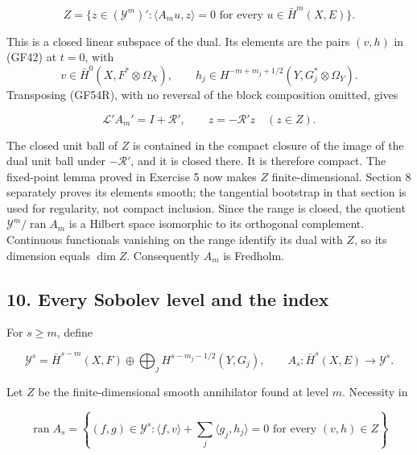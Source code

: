 \documentclass[
  11pt,
]{article}
\makeatletter
\let\ReaderOriginalAnchorStart\hyper@anchorstart
\let\ReaderOriginalAnchorEnd\hyper@anchorend
\let\ReaderPendingAliases\@empty
\def\ReaderArmAliases#1{\gdef\ReaderPendingAliases{#1}}
\def\hyper@anchorstart#1{\ReaderIfNativeAnchorTF{#1}{\ReaderPendingAliases\global\let\ReaderPendingAliases\@empty}{}\ReaderOriginalAnchorStart{#1}}
\makeatother
\begin{document}
\[
 Z=\{z\in(\mathcal Y^m)':\langle A_mu,z\rangle=0
           \text{ for every }u\in\bar H^m(X,E)\}.
 \tag{GF54Z}
\]

This is a closed linear subspace of the dual. Its elements are the pairs
\((v,h)\) in (GF42) at \(t=0\), with \[
 v\in\bar H^0(X,F^*\otimes\Omega_X),\qquad
 h_j\in H^{-m+m_j+1/2}(Y,G_j^*\otimes\Omega_Y).
\] Transposing (GF54R), with no reversal of the block composition
omitted, gives

\[
 \mathscr L'A_m'=I+\mathscr R',\qquad
 z=-\mathscr R'z\quad(z\in Z).
 \tag{GF54D}
\]

The closed unit ball of \(Z\) is contained in the compact closure of the
image of the dual unit ball under \(-\mathscr R'\), and it is closed
there. It is therefore compact. The fixed-point lemma proved in Exercise
5 now makes \(Z\) finite-dimensional. Section 8 separately proves its
elements smooth; the tangential bootstrap in that section is used for
regularity, not compact inclusion. Since the range is closed, the
quotient \(\mathcal Y^m/\operatorname{ran}A_m\) is a Hilbert space
isomorphic to its orthogonal complement. Continuous functionals
vanishing on the range identify its dual with \(Z\), so its dimension
equals \(\dim Z\). Consequently \(A_m\) is Fredholm.

\ReaderArmAliases{\ReaderOriginalAnchorStart{AN03-GCF-010}\ReaderOriginalAnchorEnd\begingroup\expandafter\def\csname @currentHref\endcsname{AN03-GCF-010}\label{AN03-GCF-010}\endgroup\ReaderOriginalAnchorStart{10-every-sobolev-level-and-the-index}\ReaderOriginalAnchorEnd\begingroup\expandafter\def\csname @currentHref\endcsname{10-every-sobolev-level-and-the-index}\label{10-every-sobolev-level-and-the-index}\endgroup\ReaderOriginalAnchorStart{every-sobolev-level-and-the-index}\ReaderOriginalAnchorEnd}
\subsection{10. Every Sobolev level and the
index}\label{every-sobolev-level-and-the-index}

For \(s\geq m\), define

\[
 \mathcal Y^s=\bar H^{s-m}(X,F)\oplus
 \bigoplus_jH^{s-m_j-1/2}(Y,G_j),
 \qquad
 A_s:\bar H^s(X,E)\longrightarrow\mathcal Y^s.
 \tag{GF55}
\]

Let \(Z\) be the finite-dimensional smooth annihilator found at level
\(m\). Necessity in

\[
 \operatorname{ran}A_s
 =\left\{(f,g)\in\mathcal Y^s:
   \langle f,v\rangle+\sum_j\langle g_j,h_j\rangle=0
   \text{ for every }(v,h)\in Z\right\}
 \tag{GF56}
\]
\end{document}
